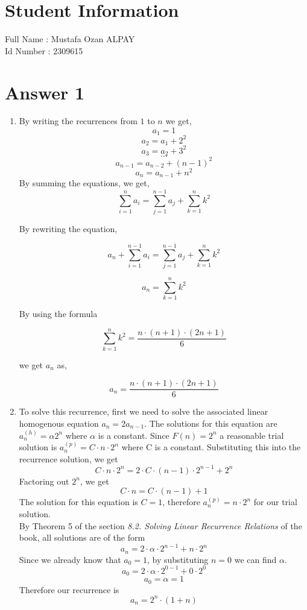 \documentclass[12pt]{article}
\begin{document}
\section*{Student Information } 
Full Name : Mustafa Ozan ALPAY \\
Id Number : 2309615 \\

\section*{Answer 1}
\begin{enumerate}
    \item By writing the recurrences from $1$ to $n$ we get, 
    $$a_1 = 1$$ 
    $$a_2 = a_1 + 2^2$$ 
    $$a_3 = a_2 + 3^2$$  
    $$ . . . $$ 
    $$a_{n-1} = a_{n-2} + (n-1)^2$$ 
    $$a_n = a_{n-1} + n^2 $$ 
    By summing the equations, we get, 
    $$ \sum\limits_{i=1}^{n} a_i = \sum\limits_{j=1}^{n-1} a_j + \sum\limits_{k=1}^{n} k^2 $$ 
    
    By rewriting the equation, 
    
    $$ a_n + \sum\limits_{i=1}^{n-1} a_i   = \sum\limits_{j=1}^{n-1} a_j + \sum\limits_{k=1}^{n} k^2  $$ 
    
    $$ a_n = \sum\limits_{k=1}^{n} k^2 $$ 
    
    By using the formula 
    
    $$ \sum\limits_{k=1}^{n} k^2 = \dfrac{n\cdot (n+1) \cdot (2n+1)}{6} $$
    
    we get $a_n$ as,
    
    $$ a_n = \dfrac{n \cdot (n+1)\cdot (2n+1)}{6} $$ 
    
    \item To solve this recurrence, first we need to solve the associated linear homogenous equation $a_n=2a_{n-1}$. The solutions for this equation are $a_n^{(h)} = \alpha 2^n$ where $\alpha$ is a constant. Since $F(n)=2^n$ a reasonable trial solution is $a_n^{(p)} = C \cdot n \cdot 2^n $ where C is a constant. Substituting this into the recurrence solution, we get $$  C \cdot n \cdot 2^n = 2 \cdot  C \cdot (n-1) \cdot 2^{n-1}+2^n $$ 
    Factoring out $2^n$, we get $$  C \cdot n = C \cdot (n-1) +1 $$ 
    The solution for this equation is $C=1$, therefore $a_n^{(p)} = n \cdot 2^n $ for our trial solution. \\
    By Theorem 5 of the section \textit{8.2. Solving Linear Recurrence Relations} of the book, all solutions are of the form $$ a_n = 2 \cdot \alpha \cdot 2^{n-1} + n \cdot 2^n $$
    Since we already know that $a_0 = 1$, by substituting $n=0$ we can find $\alpha$. 
    $$ a_0 = 2 \cdot \alpha \cdot 2^{0-1} + 0 \cdot 2^0 $$
    $$ a_0 = \alpha  = 1$$
    Therefore our recurrence is $$ a_n =  2^n \cdot (1 + n) $$
    
\end{enumerate}
\end{document}
